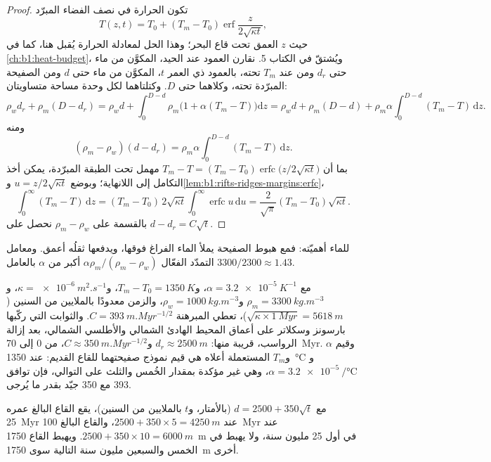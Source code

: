 \begin{proof}
تكون الحرارة في نصف الفضاء المبرّد
\[
  T(z, t) = T_0 + (T_m - T_0)\operatorname{erf}\frac{z}{2\sqrt{\kappa t}},
\]
حيث $z$ العمق تحت قاع البحر؛ وهذا الحل لمعادلة الحرارة يُقبل هنا، كما في \cref{ch:b1:heat-budget}، ويُشتقّ في الكتاب 5.
نقارن العمود عند الحيد، المكوَّن من ماء حتى $d_r$ ومن  عند $T_m$ تحته، بالعمود ذي العمر $t$، المكوَّن من ماء حتى $d$ ومن الصفيحة المبرّدة تحته، وكلاهما حتى  $D$. وكتلتاهما لكل وحدة مساحة متساويتان:
\[
  \rho_w d_r + \rho_m (D - d_r) = \rho_w d + \int_0^{D-d}\rho_m\bigl(1 + \alpha(T_m - T)\bigr)\mathrm dz
  = \rho_w d + \rho_m (D - d) + \rho_m\alpha\int_0^{D-d}(T_m - T)\,\mathrm dz.
\]
ومنه
\[
  (\rho_m - \rho_w)(d - d_r) = \rho_m\alpha\int_0^{D-d}(T_m - T)\,\mathrm dz.
\]
بما أن $T_m - T = (T_m - T_0)\operatorname{erfc}\bigl(z/2\sqrt{\kappa t}\bigr)$ مهمل تحت الطبقة المبرّدة، يمكن أخذ التكامل إلى اللانهاية؛ وبوضع $u = z/2\sqrt{\kappa t}$ و\cref{lem:b1:rifts-ridges-margins:erfc}،
\[
  \int_0^\infty (T_m - T)\,\mathrm dz = (T_m - T_0)\,2\sqrt{\kappa t}\int_0^\infty\operatorname{erfc}u\,\mathrm du
  = \frac{2}{\sqrt\pi}(T_m - T_0)\sqrt{\kappa t}.
\]
بالقسمة على $\rho_m - \rho_w$ نحصل على $d - d_r = C\sqrt t$.
\end{proof}

للماء أهميّته: فمع هبوط الصفيحة يملأ الماء الفراغ فوقها، ويدفعها ثقلُه أعمق. ومعامل التمدّد الفعّال $\alpha\rho_m/(\rho_m - \rho_w)$ أكبر من $\alpha$ بالعامل $3300/2300 \approx 1.43$.

مع $\alpha = \qty{3.2e-5}{K^{-1}}$، و$T_m - T_0 = \qty{1350}{K}$، و$\kappa = \qty{e-6}{m^2.s^{-1}}$، و$\rho_m = \qty{3300}{kg.m^{-3}}$ و$\rho_w = \qty{1000}{kg.m^{-3}}$، والزمن معدودًا بالملايين من السنين ($\sqrt{\kappa\times\qty{1}{Myr}} = \qty{5618}{m}$)، تعطي المبرهنة $C = \qty{393}{m.Myr^{-1/2}}$. والثوابت التي ركّبها بارسونز وسكلاتر على أعماق المحيط الهادئ الشمالي والأطلسي الشمالي، بعد إزالة الرواسب، قريبة منها: $d_r \approx \qty{2500}{m}$ و$C \approx \qty{350}{m.Myr^{-1/2}}$، من 0 إلى \qty{70}{Myr}. وقيم $\alpha$ و$T_m$ المستعملة أعلاه هي قيم نموذج صفيحتهما للقاع القديم:  عند \qty{1350}{\degreeCelsius} و$\alpha = \qty{3.2e-5}{\per\degreeCelsius}$، وهي غير مؤكدة بمقدار الخُمس والثلث على التوالي، فإن توافق 393 مع 350 جيّد بقدر ما يُرجى.

\begin{example}\label{ex:b1:rifts-ridges-margins:depths}
مع $d = 2500 + 350\sqrt t$ (بالأمتار، و$t$ بالملايين من السنين)، يقع القاع البالغ عمره \qty{25}{Myr} عند $2500 + 350\times5 = \qty{4250}{m}$، والقاع البالغ \qty{100}{Myr} عند $2500 + 350\times10 = \qty{6000}{m}$. ويهبط القاع \qty{1750}{m} في أول 25 مليون سنة، ولا يهبط في الخمس والسبعين مليون سنة التالية سوى \qty{1750}{m} أخرى.
\end{example}

